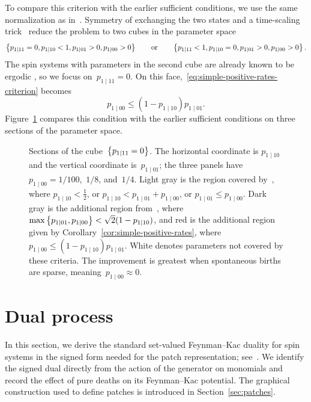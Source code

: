 \documentclass[EJP,preprint,NODS,nobera]{ejpecp}
\begin{document}
To compare this criterion with the earlier sufficient conditions, we use the
same normalization as in~\cite{GluchowskiMenz2025}. Symmetry of exchanging the two states and a time-scaling trick~\cite{GluchowskiMenz2025} reduce the problem to two cubes in the parameter space
\begin{equation*}
\left\{p_{1\mid11}=0, p_{1\mid 10}<1, p_{1\mid 01}>0, p_{1\mid 00}>0\right\}
\qquad\text{or}\qquad
\left\{p_{1\mid11}<1, p_{1\mid 10}=0, p_{1\mid 01}>0, p_{1\mid 00}>0\right\}.
\end{equation*}
The spin systems with parameters in the second cube are already known to be ergodic
\cite[Section~7]{GluchowskiMenz2025}, so we focus on~$p_{1\mid11}=0$. On this
face,~\eqref{eq:simple-positive-rates-criterion} becomes
\begin{equation}
\label{eq:simple-positive-rates-face}
p_{1\mid00}
\leq
(1-p_{1\mid10})p_{1\mid01}.
\end{equation}
Figure~\ref{fig:simple-ips-ergodicity-regions} compares this condition with
the earlier sufficient conditions on three sections of the parameter space.

\begin{figure}[htbp]
\centering

\caption{Sections of the cube~$\left\{p_{1\mid11}=0\right\}$. The horizontal coordinate is
$p_{1\mid10}$ and the vertical coordinate is~$p_{1\mid01}$; the three panels
have~$p_{1\mid00}=1/100$,~$1/8$, and~$1/4$. Light gray is the region covered
by~\cite{GluchowskiMenz2025}, where
$p_{1\mid10}<\tfrac12$, or
$p_{1\mid10}<p_{1\mid01}+p_{1\mid00}$, or
$p_{1\mid01}\leq p_{1\mid00}$. Dark gray is the additional region from~\cite{GluchowskiMenz2026}, where
$\max\left\{p_{1\mid01},p_{1\mid00}\right\}<\sqrt2(1-p_{1\mid10})$, and red is the
additional region given by Corollary~\ref{cor:simple-positive-rates}, where
$p_{1\mid00}\leq(1-p_{1\mid10})p_{1\mid01}$. White denotes parameters not
covered by these criteria. The improvement is greatest when spontaneous births are sparse, meaning~$p_{1\mid 00}\approx 0$.}
\label{fig:simple-ips-ergodicity-regions}
\end{figure}
\FloatBarrier

\section{Dual process}
\label{sec:dual}

In this section, we derive the standard set-valued Feynman--Kac duality for
spin systems in the signed form needed for the patch representation; see~\cite{Harris1978,Griffeath1979,Gray1986,JansenKurt2014}. We identify the
signed dual directly from the action of the generator on monomials and record
the effect of pure deaths on its Feynman--Kac potential. The graphical
construction used to define patches is introduced in
Section~\ref{sec:patches}.
\end{document}

